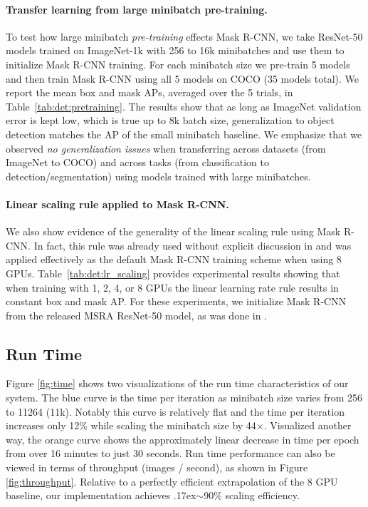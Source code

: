\documentclass[10pt,twocolumn,letterpaper]{article}
\def\x{\times}
\newcommand{\app}{\raise.17ex\hbox{$\scriptstyle\sim$}}
\begin{document}
\paragraph{Transfer learning from large minibatch pre-training.} To test how large minibatch \emph{pre-training} effects Mask R-CNN, we take ResNet-50 models trained on ImageNet-1k with 256 to 16k minibatches and use them to initialize Mask R-CNN training. For each minibatch size we pre-train 5 models and then train Mask R-CNN using all 5 models on COCO (35 models total). We report the mean box and mask APs, averaged over the 5 trials, in Table~\ref{tab:det:pretraining}. The results show that as long as ImageNet validation error is kept low, which is true up to 8k batch size, generalization to object detection matches the AP of the small minibatch baseline. We emphasize that we observed \emph{no generalization issues} when transferring across datasets (from ImageNet to COCO) and across tasks (from classification to detection/segmentation) using models trained with large minibatches.

\paragraph{Linear scaling rule applied to Mask R-CNN.} We also show evidence of the generality of the linear scaling rule using Mask R-CNN. In fact, this rule was already used without explicit discussion in \cite{He2016} and was applied effectively as the default Mask R-CNN training scheme when using 8 GPUs. Table~\ref{tab:det:lr_scaling} provides experimental results showing that when training with 1, 2, 4, or 8 GPUs the linear learning rate rule results in constant box and mask AP. For these experiments, we initialize Mask R-CNN from the released MSRA ResNet-50 model, as was done in \cite{He2017}.

\subsection{Run Time}\label{sec:exp:timing}

Figure \ref{fig:time} shows two visualizations of the run time characteristics of our system. The blue curve is the time per iteration as minibatch size varies from 256 to 11264 (11k). Notably this curve is relatively flat and the time per iteration increases only 12\% while scaling the minibatch size by 44$\x$. Visualized another way, the orange curve shows the approximately linear decrease in time per epoch from over 16 minutes to just 30 seconds. Run time performance can also be viewed in terms of throughput (images / second), as shown in Figure \ref{fig:throughput}. Relative to a perfectly efficient extrapolation of the 8 GPU baseline, our implementation achieves \app90\% scaling efficiency.
\end{document}
